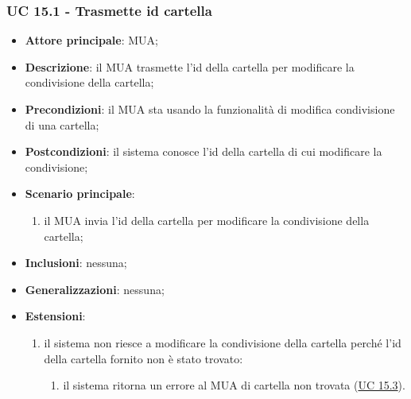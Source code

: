     \subsubsection{UC 15.1 - Trasmette id cartella} \label{sec:UC15.1}
    \begin{itemize}
        \item \textbf{Attore principale}: MUA;
        \item \textbf{Descrizione}: il MUA trasmette l'id della cartella per modificare la condivisione della cartella;
        \item \textbf{Precondizioni}: il MUA sta usando la funzionalità di modifica condivisione di una cartella;
        \item \textbf{Postcondizioni}: il sistema conosce l'id della cartella di cui modificare la condivisione;
        \item \textbf{Scenario principale}:
            \begin{enumerate}
                \item il MUA invia l'id della cartella per modificare la condivisione della cartella;
            \end{enumerate}
        \item \textbf{Inclusioni}: nessuna;
        \item \textbf{Generalizzazioni}: nessuna;
        \item \textbf{Estensioni}:
            \begin{enumerate}[label=\alph*.]
                \item il sistema non riesce a modificare la condivisione della cartella perché l'id della cartella fornito non è stato trovato:
                \begin{enumerate}[label=\arabic*.]
                    \item il sistema ritorna un errore al MUA di cartella non trovata (\hyperref[sec:UC15.3]{UC 15.3}).
                \end{enumerate}
            \end{enumerate}
    \end{itemize}


